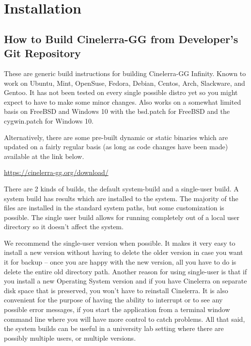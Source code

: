 \chapter{Installation}
\label{cha:Installation}
\section{How to Build Cinelerra-GG from Developer's Git Repository}%
\label{sec:How_to_build}

These are generic build instructions for building Cinelerra-GG Infinity.  
Known to work on Ubuntu, Mint, OpenSuse, Fedora, Debian, Centos, Arch, Slackware, and Gentoo. 
It has not been tested on every single possible distro yet so you might expect to have to make some minor changes.
Also works on a somewhat limited basis on FreeBSD and Windows 10 with the bsd.patch for FreeBSD
and the cygwin.patch for Windows 10.

Alternatively, there are some pre-built dynamic or static binaries which are updated on a fairly regular basis (as long as code changes have been made) available at the link below.

\begin{center}
	{\small \url{https://cinelerra-gg.org/download/}}
\end{center}

There are 2 kinds of builds, the default system-build and a single-user build.  
A system build has results which are installed to the system. 
The majority of the files are installed in the standard system paths, but some customization is possible. 
The single user build allows for running completely out of a local user directory so it doesn't affect the system.

We recommend the single-user version when possible.  
It makes it very easy to install a new version without having to delete the older version in case you want it for backup -- once you are happy with the new version, all you have to do is delete the entire old directory path.  
Another reason for using single-user is that if you install a new Operating System version and if you have Cinelerra on separate disk space that is preserved, you won't have to reinstall Cinelerra.  
It is also convenient for the purpose of having the ability to interrupt or to see any possible error messages, if you start the application from a terminal window command line where you will have more control to catch problems.  
All that said, the system builds can be useful in a university lab setting where there are possibly multiple users, or multiple versions.

